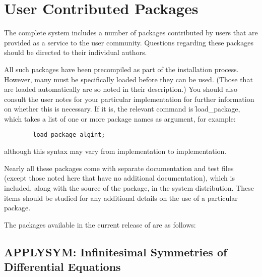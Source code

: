 %
%


\chapter{User Contributed Packages} 
\label{chap-user}
The complete {\REDUCE} system includes a number of packages contributed by
users that are provided as a service to the user community.  Questions
regarding these packages should be directed to their individual authors.

All such packages have been precompiled as part of the installation process.
However, many must be specifically loaded before they can be used. (Those
that are loaded automatically are so noted in their description.) You should
also consult the user notes for your particular implementation for further
information on whether this is necessary.  If it is, the relevant command is
\f{load\_package}, which takes a list of one or
more package names as argument, for example:

\begin{verbatim}
        load_package algint;
\end{verbatim}
although this syntax may vary from implementation to implementation.

Nearly all these packages come with separate documentation and test files
(except those noted here that have no additional documentation), which is
included, along with the source of the package, in the {\REDUCE} system
distribution.  These items should be studied for any additional details on
the use of a particular package.

\let\origsectionmark=\sectionmark
\def\sectionmark#1{}


The packages available in the current release of {\REDUCE} are as follows:

\newpage

\section{APPLYSYM: Infinitesimal Symmetries of Differential Equations}
\label{package:APPLYSYM}

